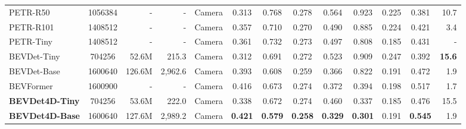 \documentclass[10pt,twocolumn,letterpaper]{article}
\begin{document}
\begin{table*}[t]
{\begin{tabular}{l|crrc|cccccc|c|r}
    PETR-R50  \cite{PETR}      &1056384    &-         &-           & Camera   & 0.313         & 0.768             & 0.278              & 0.564             & 0.923             & 0.225             & 0.381           &10.7 \\
    PETR-R101 \cite{PETR}      &1408512    &-         &-           & Camera   & 0.357         & 0.710             & 0.270              & 0.490             & 0.885             & 0.224             & 0.421           &3.4 \\
    PETR-Tiny \cite{PETR}      &1408512    &-         &-           & Camera   & 0.361         & 0.732             & 0.273              & 0.497             & 0.808             & 0.185             & 0.431           &- \\
    BEVDet-Tiny\cite{BEVDet}   &704256     &52.6M      &215.3      & Camera   & 0.312         & 0.691             & 0.272              & 0.523             & 0.909             & 0.247             & 0.392           &\textbf{15.6}\\
    BEVDet-Base\cite{BEVDet}   &1600640    &126.6M     &2,962.6    & Camera   & 0.393         & 0.608             & 0.259              & 0.366             & 0.822             & 0.191             & 0.472           &1.9\\
    BEVFormer \cite{BEVFormer} &1600900   &-          &-          & Camera   & 0.416         & 0.673             & 0.274              & 0.372             & 0.394             & 0.198             & 0.517           &1.7\\
    \textbf{BEVDet4D-Tiny}     &704256     &53.6M      &222.0      & Camera   & 0.338         & 0.672             & 0.274              & 0.460             & 0.337             & 0.185             & 0.476           &15.5\\
    \textbf{BEVDet4D-Base}     &1600640    &127.6M     &2,989.2    & Camera   & \textbf{0.421}& \textbf{0.579}    & \textbf{0.258}     & \textbf{0.329}    & \textbf{0.301}    & 0.191             & \textbf{0.545}  &1.9\\


\end{tabular}}
\end{table*}
\end{document}
